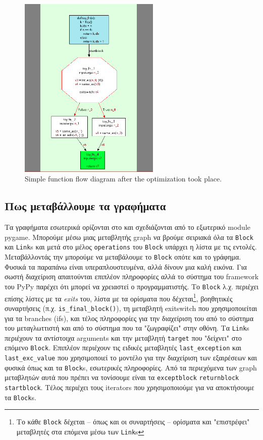 \begin{figure}[h]
\centering
\includegraphics[width=0.6\textwidth]{simple-func-after.png}
\caption{Simple function flow diagram after the optimization took place.}
\label{figure-3}
\end{figure}

\subsection{Πως μεταβάλλουμε τα γραφήματα}

Τα γραφήματα εσωτερικά ορίζονται στο  και
σχεδιάζονται από το εξωτερικό module pygame. Μπορούμε μέσω μιας μεταβλητής graph
να βρούμε σειριακά όλα τα \texttt{Block} και \texttt{Link}s και μετά στο μέλος
\texttt{operations} του \texttt{Block} υπάρχει η λίστα με τις εντολές.
Μεταβάλλοντάς την μπορούμε να μεταβάλουμε το \texttt{Block} οπότε και το
γράφημα. Φυσικά τα παραπάνω είναι υπεραπλουστευμένα, αλλά δίνουν μια καλή
εικόνα. Για σωστή διαχείριση απαιτούνται επιπλέον πληροφορίες αλλά το σύστημα
του framework του PyPy παρέχει ότι μπορεί να χρειαστεί ο προγραμματιστής. Το
\texttt{Block} λ.χ. περιέχει επίσης λίστες με τα \textit{exits} του, λίστα με τα
ορίσματα που δέχεται\footnote{Το κάθε \texttt{Block} δέχεται – όπως και οι
συναρτήσεις – ορίσματα και "επιστρέφει" μεταβλητές στα επόμενα μέσω των
\texttt{Link}s}, βοηθητικές συναρτήσεις (π.χ. \texttt{is\_final\_block()}), τη
μεταβλητή exitswitch που χρησιμοποιείται για τα branches (ifs), και τέλος
πληροφορίες για την διαχείριση του από το σύστημα του μεταγλωττιστή και από το
σύστημα που τα "ζωγραφίζει" στην οθόνη. Τα \texttt{Link}s περιέχουν τα
αντίστοιχα arguments και την μεταβλητή \texttt{target} που "δείχνει" στο επόμενο
\texttt{Block}. Επιπλέον περιέχουν τις ειδικές μεταβλητές
\texttt{last\_exception} και \texttt{last\_exc\_value} που χρησιμοποιεί το
μοντέλο για την διαχείριση των εξαιρέσεων και φυσικά όπως και τα
\texttt{Block}s, εσωτερικές πληροφορίες. Από τα περιεχόμενα των graph μεταβλητών
αυτά που πρέπει να τονίσουμε είναι τα \texttt{exceptblock} \texttt{returnblock}
\texttt{startblock}. Τέλος περιέχει τους iterators που χρησιμοποιούμε για να
αποκτήσουμε τα \texttt{Block}s.

